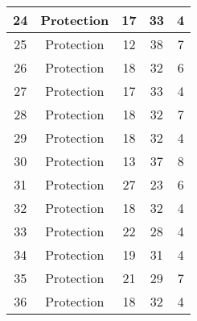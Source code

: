 \documentclass[results.tex]{subfiles}
\begin{document}
\begin{center}
\begin{tabular}{| c || c | c | c | c |}
            \hline
            24                      & Protection                   & 17                     & 33                      & 4                    \\
            \hline
            25                      & Protection                   & 12                     & 38                      & 7                    \\
            \hline
            26                      & Protection                   & 18                     & 32                      & 6                    \\
            \hline
            27                      & Protection                   & 17                     & 33                      & 4                    \\
            \hline
            28                      & Protection                   & 18                     & 32                      & 7                    \\
            \hline
            29                      & Protection                   & 18                     & 32                      & 4                    \\
            \hline
            30                      & Protection                   & 13                     & 37                      & 8                    \\
            \hline
            31                      & Protection                   & 27                     & 23                      & 6                    \\
            \hline
            32                      & Protection                   & 18                     & 32                      & 4                    \\
            \hline
            33                      & Protection                   & 22                     & 28                      & 4                    \\
            \hline
            34                      & Protection                   & 19                     & 31                      & 4                    \\
            \hline
            35                      & Protection                   & 21                     & 29                      & 7                    \\
            \hline
            36                      & Protection                   & 18                     & 32                      & 4                    \\

\end{tabular}
\end{center}
\end{document}
